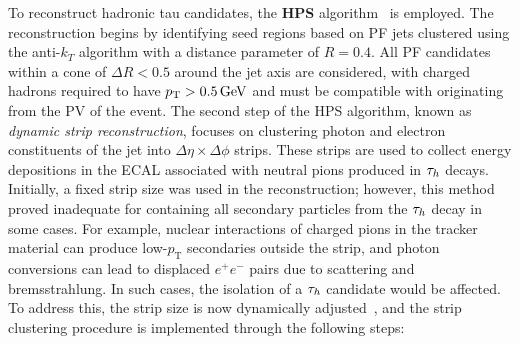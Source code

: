 To reconstruct hadronic tau candidates, the \textbf{\ac{HPS}} algorithm~\cite{Tau_Reco_ID_2015,Tau_Reco_ID_2018} is employed. The reconstruction begins by identifying seed regions based on PF jets clustered using the anti-$k_T$ algorithm with a distance parameter of $R = 0.4$. All PF candidates within a cone of $\Delta R < 0.5$ around the jet axis are considered, with charged hadrons required to have $p_\mathrm{T} > 0.5\,\text{Ge\hspace{-.08em}V}$ and must be compatible with originating from the PV of the event. The second step of the HPS algorithm, known as \textit{dynamic strip reconstruction}, focuses on clustering photon and electron constituents of the jet into $\Delta\eta \times \Delta\phi$ strips. These strips are used to collect energy depositions in the \ac{ECAL} associated with neutral pions produced in $\tau_h$ decays. Initially, a fixed strip size was used in the reconstruction; however, this method proved inadequate for containing all secondary particles from the $\tau_h$ decay in some cases. For example, nuclear interactions of charged pions in the tracker material can produce low-$p_\mathrm{T}$ secondaries outside the strip, and photon conversions can lead to displaced $e^+e^-$ pairs due to scattering and bremsstrahlung. In such cases, the isolation of a $\tau_h$ candidate would be affected. To address this, the strip size is now dynamically adjusted~\cite{Tau_Reco_ID_2018}, and the strip clustering procedure is implemented through the following steps:

